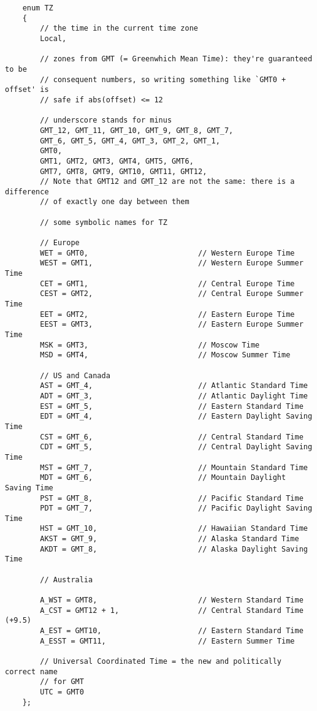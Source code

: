\begin{verbatim}
    enum TZ
    {
        // the time in the current time zone
        Local,

        // zones from GMT (= Greenwhich Mean Time): they're guaranteed to be
        // consequent numbers, so writing something like `GMT0 + offset' is
        // safe if abs(offset) <= 12

        // underscore stands for minus
        GMT_12, GMT_11, GMT_10, GMT_9, GMT_8, GMT_7,
        GMT_6, GMT_5, GMT_4, GMT_3, GMT_2, GMT_1,
        GMT0,
        GMT1, GMT2, GMT3, GMT4, GMT5, GMT6,
        GMT7, GMT8, GMT9, GMT10, GMT11, GMT12,
        // Note that GMT12 and GMT_12 are not the same: there is a difference
        // of exactly one day between them

        // some symbolic names for TZ

        // Europe
        WET = GMT0,                         // Western Europe Time
        WEST = GMT1,                        // Western Europe Summer Time
        CET = GMT1,                         // Central Europe Time
        CEST = GMT2,                        // Central Europe Summer Time
        EET = GMT2,                         // Eastern Europe Time
        EEST = GMT3,                        // Eastern Europe Summer Time
        MSK = GMT3,                         // Moscow Time
        MSD = GMT4,                         // Moscow Summer Time

        // US and Canada
        AST = GMT_4,                        // Atlantic Standard Time
        ADT = GMT_3,                        // Atlantic Daylight Time
        EST = GMT_5,                        // Eastern Standard Time
        EDT = GMT_4,                        // Eastern Daylight Saving Time
        CST = GMT_6,                        // Central Standard Time
        CDT = GMT_5,                        // Central Daylight Saving Time
        MST = GMT_7,                        // Mountain Standard Time
        MDT = GMT_6,                        // Mountain Daylight Saving Time
        PST = GMT_8,                        // Pacific Standard Time
        PDT = GMT_7,                        // Pacific Daylight Saving Time
        HST = GMT_10,                       // Hawaiian Standard Time
        AKST = GMT_9,                       // Alaska Standard Time
        AKDT = GMT_8,                       // Alaska Daylight Saving Time

        // Australia

        A_WST = GMT8,                       // Western Standard Time
        A_CST = GMT12 + 1,                  // Central Standard Time (+9.5)
        A_EST = GMT10,                      // Eastern Standard Time
        A_ESST = GMT11,                     // Eastern Summer Time

        // Universal Coordinated Time = the new and politically correct name
        // for GMT
        UTC = GMT0
    };
\end{verbatim}

